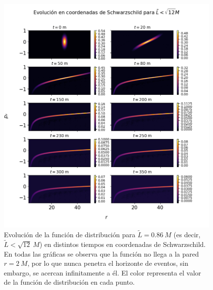 \documentclass[11pt,twoside,openright,spanish]{report}
\numberwithin{equation}{chapter}
\numberwithin{figure}{chapter}
\numberwithin{table}{chapter}
\begin{document}
\newpage
\begin{figure}[H]
	\centering
	\includegraphics[width=\textwidth,height=\textheight,keepaspectratio]{graphs_study/LmenorSchGraphs/evolutionSchMenor.png}
	\caption{Evolución de la función de distribución para $\tilde{L}=0.86\ M$ (es decir, $\tilde{L}<\sqrt{12}\ M$) en distintos tiempos en coordenadas de Schwarzschild. En todas las gráficas se observa que la función no llega a la pared $r=2\ M$, por lo que nunca penetra el horizonte de eventos, sin embargo, se acercan infinitamente a él. El color representa el valor de la función de distribución en cada punto.}
	\label{evolutionLmenorSch}
\end{figure}
\end{document}
